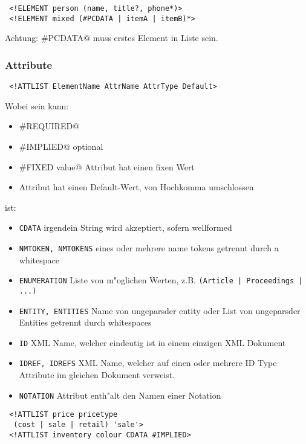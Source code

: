 \documentclass[german, 10pt, a4paper, twocolumn]{scrartcl}
\theoremstyle{definition}
\theoremstyle{remark}
\theoremstyle{example}
\begin{document}
\begin{verbatim}
 <!ELEMENT person (name, title?, phone*)>
 <!ELEMENT mixed (#PCDATA | itemA | itemB)*>
\end{verbatim}

Achtung: \verb@#PCDATA@ muss erstes Element in Liste sein.

\subsubsection{Attribute}

\begin{verbatim}
 <!ATTLIST ElementName AttrName AttrType Default>
\end{verbatim}

Wobei \verb@Default@ sein kann:
\begin{itemize}
	\item \verb@#REQUIRED@
	\item \verb@#IMPLIED@ optional
	\item \verb@#FIXED value@ Attribut hat einen fixen Wert
	\item \verb@value@ Attribut hat einen Default-Wert, von Hochkomma umschlossen
\end{itemize}

\verb@AttrType@ ist:
\begin{itemize}
	\item \verb#CDATA# irgendein String wird akzeptiert, sofern wellformed
	\item \verb#NMTOKEN, NMTOKENS# eines oder mehrere name tokens getrennt durch a whitespace
	\item \verb#ENUMERATION# Liste von m"oglichen Werten, z.B. \verb#(Article | Proceedings | ...)#
	\item \verb#ENTITY, ENTITIES# Name von ungeparsder entity oder List von ungeparsder Entities getrennt durch whitespaces
	\item \verb#ID# XML Name, welcher eindeutig ist in einem einzigen XML Dokument
	\item \verb#IDREF, IDREFS# XML Name, welcher auf einen oder mehrere ID Type Attribute im gleichen Dokument verweist.
	\item \verb#NOTATION# Attribut enth"alt den Namen einer Notation
\end{itemize}

\begin{verbatim}
 <!ATTLIST price pricetype
  (cost | sale | retail) 'sale'>
 <!ATTLIST inventory colour CDATA #IMPLIED>
\end{verbatim}
\end{document}
